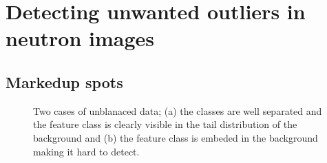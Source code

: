 \documentclass[letterpaper,10pt,english]{sphinxmanual}
\begin{document}
\section{Detecting unwanted outliers in neutron images}
\label{\detokenize{ML4NeutronImageSegmentation:detecting-unwanted-outliers-in-neutron-images}}
\begin{sphinxVerbatim}[commandchars=\\\{\}]
 
 \PYG{p}{[}\PYG{p}{]}
  
\PYG{p}{[}\PYG{p}{]}\PYG{p}{[}\PYG{p}{]}
\end{sphinxVerbatim}

\noindent{}


\subsection{Marked\sphinxhyphen{}up spots}
\label{\detokenize{ML4NeutronImageSegmentation:marked-up-spots}}
\begin{figure}[htbp]
\centering
\capstart

\noindent{}
\caption{Two cases of unblanaced data; (a) the classes are well separated and the feature class is clearly visible in the tail distribution of the background and (b) the feature class is embeded in the background making it hard to detect.}\label{\detokenize{ML4NeutronImageSegmentation:id17}}\end{figure}
\end{document}

